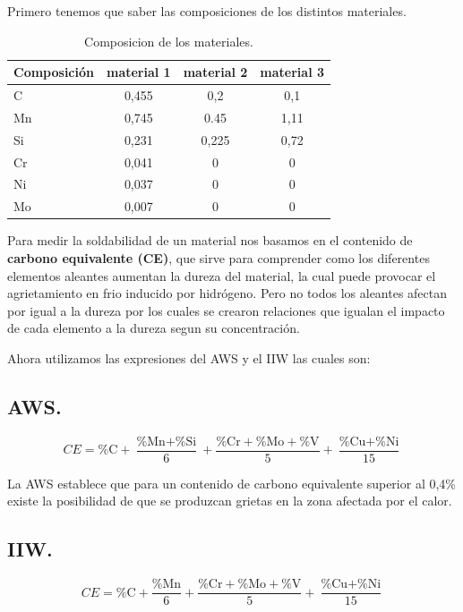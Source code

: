 \documentclass[12pt,a4paper]{article}
\begin{document}
Primero tenemos que saber las composiciones de los distintos materiales.

\begin{table}[h]
    \centering
    \begin{tabular}{l|c|c|c}
        \hline
        Composición & material 1 & material 2 & material 3\\
        \hline
        C & 0,455 & 0,2 & 0,1\\
        Mn & 0,745 & 0.45 & 1,11\\
        Si & 0,231 & 0,225 & 0,72\\
        Cr & 0,041 & 0 & 0\\
        Ni & 0,037 & 0 & 0\\
        Mo & 0,007 & 0 & 0\\
        \hline
    \end{tabular}
    \caption{Composicion de los materiales.}
\end{table}

Para medir la soldabilidad de un material nos basamos en el contenido de \textbf{carbono equivalente (CE)}, que sirve para comprender como los diferentes elementos aleantes aumentan la dureza del material, la cual puede provocar el agrietamiento en frio inducido por hidrógeno. Pero no todos los aleantes afectan por igual a la dureza por los cuales se crearon relaciones que igualan el impacto de cada elemento a la dureza segun su concentración.

Ahora utilizamos las expresiones del AWS y el IIW las cuales son:

\subsection{AWS.}

\begin{equation*}
    CE = \text{\%C} + \frac{\text{\%Mn}+\text{\%Si}}{6} + \frac{\text{\%Cr}+\text{\%Mo}+\text{\%V}}{5} + \frac{\text{\%Cu}+\text{\%Ni}}{15}
\end{equation*}

La AWS establece que para un contenido de carbono equivalente superior al 0,4\% existe la posibilidad de que se produzcan grietas en la zona afectada por el calor.

\subsection{IIW.}

\begin{equation*}
    CE = \text{\%C} + \frac{\text{\%Mn}}{6} + \frac{\text{\%Cr}+\text{\%Mo}+\text{\%V}}{5} + \frac{\text{\%Cu}+\text{\%Ni}}{15}
\end{equation*}
\end{document}

